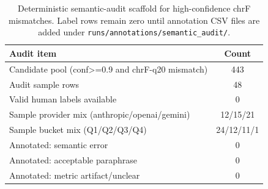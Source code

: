 \begin{table}[t]
\centering
\small
\begin{tabular}{lc}
\toprule
Audit item & Count \\
\midrule
Candidate pool (conf>=0.9 and chrF-q20 mismatch) & 443 \\
Audit sample rows & 48 \\
Valid human labels available & 0 \\
Sample provider mix (anthropic/openai/gemini) & 12/15/21 \\
Sample bucket mix (Q1/Q2/Q3/Q4) & 24/12/11/1 \\
Annotated: semantic error & 0 \\
Annotated: acceptable paraphrase & 0 \\
Annotated: metric artifact/unclear & 0 \\
\bottomrule
\end{tabular}
\caption{Deterministic semantic-audit scaffold for high-confidence chrF mismatches. Label rows remain zero until annotation CSV files are added under \texttt{runs/annotations/semantic\_audit/}.}
\label{tab:semantic_audit}
\end{table}
